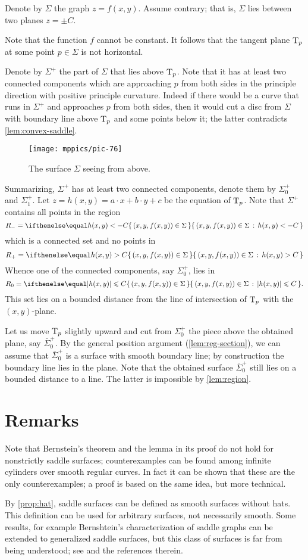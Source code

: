 Denote by $\Sigma$ the graph $z=f(x,y)$.
Assume contrary; that is, $\Sigma$ lies between two planes $z=\pm C$.

Note that the function $f$ cannot be constant.
It follows that the tangent plane $\mathrm{T}_p$ at some point $p\in\Sigma$ is not horizontal.

Denote by $\Sigma^+$ the part of $\Sigma$ that lies above $\mathrm{T}_p$.
Note that it has at least two connected components which are approaching $p$ from both sides 
in the principle direction with positive principle curvature.
Indeed if there would be a curve that runs in $\Sigma^+$ and approaches $p$ from both sides, then it would cut a disc from $\Sigma$ with boundary line above $\mathrm{T}_p$ and some points below it;
the latter contradicts \ref{lem:convex-saddle}.

\begin{figure}[h!]
\vskip-0mm
\centering
\texttt{[image: mppics/pic-76]}
\caption*{The surface $\Sigma$ seeing from above.}
\vskip0mm
\end{figure}

Summarizing, $\Sigma^+$ has at least two connected components, denote them by $\Sigma^+_0$ and $\Sigma^+_1$.
Let $z=h(x,y)=a\cdot x+b\cdot y+c$ be the equation of $\mathrm{T}_p$.
Note that $\Sigma^+$ contains all points in the region
\[R_-=\set{(x,y,f(x,y))\in\Sigma}{h(x,y)< -C}\] 
which is a connected set and no points in 
\[R_+=\set{(x,y,f(x,y))\in\Sigma}{h(x,y)> C}\]
Whence one of the connected components, say $\Sigma^+_0$, lies in 
\[R_0=\set{(x,y,f(x,y))\in\Sigma}{|h(x,y)|\le  C}.\]
This set lies on a bounded distance from the line of intersection of $\mathrm{T}_p$ with the $(x,y)$-plane.

Let us move $\mathrm{T}_p$ slightly upward and cut from $\Sigma^+_0$ the piece above the obtained plane, say $\bar\Sigma^+_0$.
By the general position argument (\ref{lem:reg-section}),
we can assume that $\bar\Sigma^+_0$ is a surface with smooth boundary line;
by construction the boundary line lies in the plane.
Note that the obtained surface $\bar\Sigma^+_0$ still lies on a bounded distance to a line.
The latter is impossible by \ref{lem:region}.
\qeds



\section{Remarks}

Note that Bernstein's theorem and the lemma in its proof do not hold for nonstrictly saddle surfaces;
counterexamples can be found among infinite cylinders over smooth regular curves.
In fact it can be shown that these are the only counterexamples;
a proof is based on the same idea, but more technical.

By \ref{prop:hat}, saddle surfaces can be defined as smooth surfaces without hats.
This definition can be used for arbitrary surfaces, not necessarily smooth.
Some results, for example Bernshtein's characterization of saddle graphs can be extended to generalized saddle surfaces, but this class of surfaces is far from being understood; see \cite[Capter 4]{alexander-kapovitch-petrunin2019} and the references therein.
